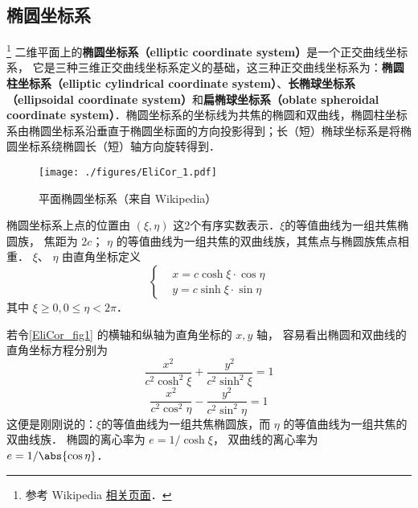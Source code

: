 
\begin{issues}
\end{issues}


\subsection{椭圆坐标系}
\footnote{参考 Wikipedia \href{https://en.wikipedia.org/wiki/Elliptic_coordinate_system}{相关页面}．}
二维平面上的\textbf{椭圆坐标系（elliptic coordinate system）}是一个正交曲线坐标系， 它是三种三维正交曲线坐标系定义的基础，这三种正交曲线坐标系为：\textbf{椭圆柱坐标系（elliptic cylindrical coordinate system）}、\textbf{长椭球坐标系（ellipsoidal coordinate system）}和\textbf{扁椭球坐标系（oblate spheroidal coordinate system）}．椭圆坐标系的坐标线为共焦的椭圆和双曲线，椭圆柱坐标系由椭圆坐标系沿垂直于椭圆坐标面的方向投影得到；长（短）椭球坐标系是将椭圆坐标系绕椭圆长（短）轴方向旋转得到．

\begin{figure}[ht]
\centering
\texttt{[image: ./figures/EliCor\_1.pdf]}
\caption{平面椭圆坐标系（来自 Wikipedia）} \label{EliCor_fig1}
\end{figure}

椭圆坐标系上点的位置由 $(\xi,\eta)$ 这2个有序实数表示．$\xi$的等值曲线为一组共焦椭圆族， 焦距为 $2c$； $\eta$ 的等值曲线为一组共焦的双曲线族，其焦点与椭圆族焦点相重． $\xi$、 $\eta$ 由直角坐标定义
\begin{equation}\label{EliCor_eq3}
\left\{\begin{aligned}
&x=c\cosh\xi\cdot\cos\eta\\
&y=c\sinh\xi\cdot\sin\eta
\end{aligned}\right.
\end{equation}
其中 $\xi\geq0,0\leq\eta<2\pi$．

若令\autoref{EliCor_fig1} 的横轴和纵轴为直角坐标的 $x, y$ 轴， 容易看出椭圆和双曲线的直角坐标方程分别为
\begin{equation}\label{EliCor_eq4}
\frac{x^2}{c^2\cosh^2\xi}+\frac{y^2}{c^2\sinh^2\xi}=1
\end{equation}
\begin{equation}\label{EliCor_eq5}
\frac{x^2}{c^2\cos^2\eta}-\frac{y^2}{c^2\sin^2\eta}=1
\end{equation}
这便是刚刚说的：$\xi$的等值曲线为一组共焦椭圆族，而 $\eta$ 的等值曲线为一组共焦的双曲线族． 椭圆的离心率为 $e = 1/\cosh \xi$， 双曲线的离心率为 $e = 1/\abs{\cos \eta}$．

